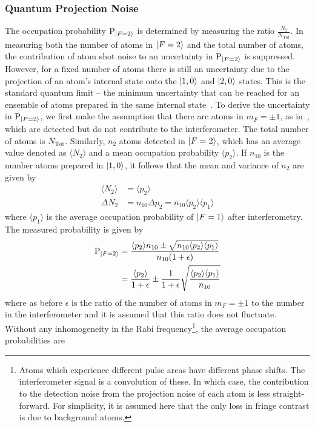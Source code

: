 \subsubsection{Quantum Projection Noise}
The occupation probability $\text{P}_{\ket{F=2}}$ is determined by measuring the ratio
$\frac{N_2}{N_\text{Tot}}$. In
measuring both the number of atoms in $\ket{F=2}$ and the total number of atoms, the contribution of atom shot
noise to an uncertainty in $\text{P}_{\ket{F=2}}$ is suppressed. However, for a
fixed number of atoms there is still an uncertainty due to the
projection of an atom's internal state onto the $\ket{1,0}$ and
$\ket{2,0}$ states. This is the standard quantum limit -- the minimum
uncertainty that can be reached for an ensemble of atoms prepared in
the same internal state~\cite{Bollinger1996}. 
To derive the uncertainty in $\text{P}_{\ket{F=2}}$, we first make the assumption
that there are atoms in $m_F=\pm 1$, as
in~, which are detected but do not
contribute to the interferometer. The total number of atoms is
$N_\text{Tot}$. Similarly, $n_2$ atoms detected in $\ket{F=2}$, which
has an average value denoted as $\langle N_2 \rangle$ and a mean
occupation probability $\langle p_2 \rangle$. If $n_{10}$ is the
number atoms prepared in $\ket{1,0}$, it follows that the mean and
variance of $n_2$ are given by
\begin{align}
  \langle N_2 \rangle &= \langle p_2 \rangle \\
  \Delta N_2 &= n_{10} \Delta p_2 = n_{10} \langle p_2 \rangle \langle
  p_1 \rangle \label{eq:proj_noise}
\end{align}
where $\langle p_1 \rangle$ is the average occupation probability of
$\ket{F=1}$ after interferometry. The measured probability is given by
\begin{align}
  \text{P}_{\ket{F=2}} &= \frac{\langle p_2 \rangle n_{10} \pm \sqrt{n_{10}
  \langle p_2 \rangle \langle p_1 \rangle}}{n_{10}(1+\epsilon)}
  \nonumber \\
                &= \frac{\langle p_2 \rangle}{1+\epsilon} \pm
                \frac{1}{1+\epsilon} \sqrt{\frac{\langle p_2 \rangle
                \langle p_1 \rangle}{n_{10}}} 
                \label{eq:prob_noise}
\end{align}
where as before $\epsilon$ is the ratio of the number of atoms in $m_F = \pm 1$ to
the number in the interferometer and it is assumed that this ratio
does not fluctuate. Without any inhomogeneity in the
Rabi frequency\footnote{Atoms which experience different pulse areas
  have different phase shifts. The interferometer signal is a
convolution of these. In which case, the contribution to the detection
noise from the projection noise of each atom is less straight-forward.
For simplicity, it is assumed here that the only loss
in fringe contrast is due to background atoms.}, the average occupation probabilities are 
